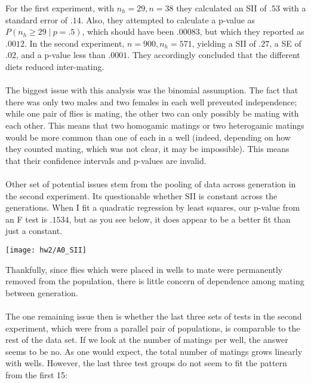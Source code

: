 \documentclass[11pt]{article}
\newcommand{\st}{ \; \big | \:}
\theoremstyle{definition}
\begin{document}
\begin{itemize}
        For the first experiment, with $n_h=29, n=38$ they calculated an SII of $.53$ with a standard error of $.14$. Also, they attempted to calculate a p-value as $P(n_h\geq 29 \st p =.5)$, which should have been $.00083$, but which they reported as $.0012$. In the second experiment, $n=900, n_h=571$, yielding a SII of $.27$, a SE of $.02$, and a p-value less than $.0001$. They accordingly concluded that the different diets reduced inter-mating. \\
        \vspace{-2mm} \\
        The biggest issue with this analysis was the binomial assumption. The fact that there was only two males and two females in each well prevented independence; while one pair of flies is mating, the other two can only possibly be mating with each other. This means that two homogamic matings or two heterogamic matings would be more common than one of each in a well (indeed, depending on how they counted mating, which was not clear, it may be impossible). This means that their confidence intervals and p-values are invalid. \\
        \vspace{-2mm} \\
        Other set of potential issues stem from the pooling of data across generation in the second experiment. Its questionable whether SII is constant across the generations. When I fit a quadratic regression by least squares, our p-value from an F test is $.1534$, but as you see below, it does appear to be a better fit than just a constant. 
        \begin{center}
            \texttt{[image: hw2/A0\_SII]} 
        \end{center}
        Thankfully, since flies which were placed in wells to mate were permanently removed from the population, there is little concern of dependence among mating between generation.\\
        \vspace{-2mm} \\
        The one remaining issue then is whether the last three sets of tests in the second experiment, which were from a parallel pair of populations, is comparable to the rest of the data set. If we look at the number of matings per well, the answer seems to be no. As one would expect, the total number of matings grows linearly with wells. However, the last three test groups do not seem to fit the pattern from the first 15:
        \begin{center}

\end{center}
\end{itemize}
\end{document}
